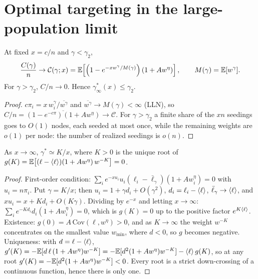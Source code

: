 \section{Optimal targeting in the large-population limit}\label{sec:optimal}

\begin{lemma}
At fixed $x=c/n$ and $\gamma<\gamma_2$,
\[
\frac{C(\gamma)}n\to\mathcal C(\gamma;x)=\mathbb{E}\!\left[\left(1-e^{-xw^\gamma/M(\gamma)}\right)\left(1+Aw^\eta\right)\right],
\qquad M(\gamma)=\mathbb{E}[w^\gamma].
\]
For $\gamma>\gamma_2$, $C/n\to0$. Hence $\gamma^*_\infty(x)\le\gamma_2$.
\end{lemma}
\begin{proof}
$c\pi_i=x\,w_i^\gamma/\overline{w^\gamma}$ and $\overline{w^\gamma}\to M(\gamma)<\infty$ (LLN), so
$C/n=\overline{(1-e^{-c\pi})(1+Aw^\eta)}\to\mathcal C$. For $\gamma>\gamma_2$ a finite share of the $xn$
seedings goes to $O(1)$ nodes, each seeded at most once, while the remaining
weights are $o(1)$ per node: the number of realized seedings is $o(n)$.
\end{proof}

\begin{proposition}
As $x\to\infty$, $\gamma^*\simeq K/x$, where $K>0$ is the unique root of
$g(K)=\mathbb{E}\!\left[(\ell-\langle \ell\rangle)(1+Aw^\eta)\,w^{-K}\right]=0$.
\end{proposition}
\begin{proof}
First-order condition: $\sum_ie^{-xu_i}u_i(\ell_i-\bar\ell_\gamma)(1+Aw_i^\eta)=0$ with
$u_i=n\pi_i$. Put $\gamma=K/x$; then $u_i=1+\gamma d_i+O(\gamma^2)$, $d_i=\ell_i-\langle \ell\rangle$,
$\bar\ell_\gamma\to\langle \ell\rangle$, and $xu_i=x+Kd_i+O(K\gamma)$. Dividing by $e^{-x}$ and letting
$x\to\infty$: $\sum_ie^{-Kd_i}d_i(1+Aw_i^\eta)=0$, which is $g(K)=0$ up to the positive
factor $e^{K\langle \ell\rangle}$. Existence: $g(0)=A\,\mathrm{Cov}(\ell,w^\eta)>0$, and as $K\to\infty$ the
weight $w^{-K}$ concentrates on the smallest value $w_{\min}$, where $d<0$, so $g$
becomes negative. Uniqueness: with $d=\ell-\langle \ell\rangle$,
$g'(K)=-\mathbb{E}[d\,\ell\,(1+Aw^\eta)w^{-K}]=-\mathbb{E}[d^2(1+Aw^\eta)w^{-K}]-\langle \ell\rangle\,g(K)$, so at any root
$g'(K)=-\mathbb{E}[d^2(1+Aw^\eta)w^{-K}]<0$. Every root is a strict down-crossing of a
continuous function, hence there is only one.
\end{proof}

